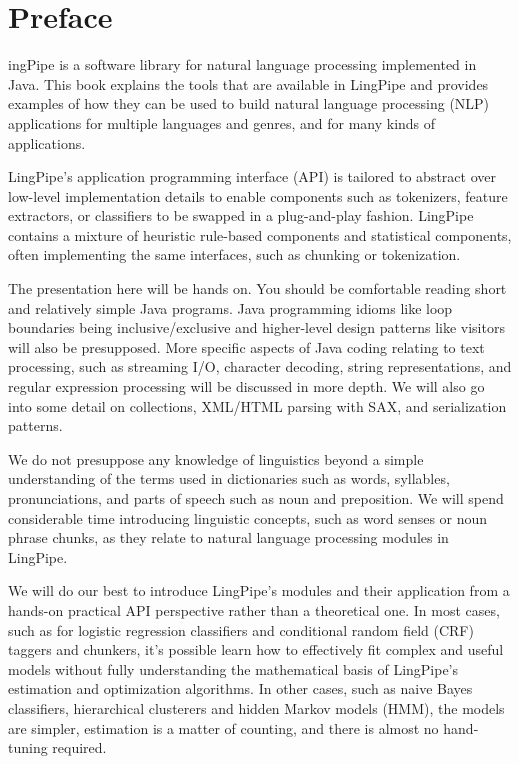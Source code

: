 \chapter*{Preface}
\pagestyle{fancy}%

ingPipe is a software library for natural language processing
implemented in Java.  This book explains the tools that are available
in LingPipe and provides examples of how they can be used to build
natural language processing (NLP) applications for multiple languages
and genres, and for many kinds of applications.

LingPipe's application programming interface (API) is tailored to
abstract over low-level implementation details to enable components
such as tokenizers, feature extractors, or classifiers to be swapped
in a plug-and-play fashion.  LingPipe contains a mixture of heuristic
rule-based components and statistical components, often implementing
the same interfaces, such as chunking or tokenization.

The presentation here will be hands on.  You should be comfortable
reading short and relatively simple Java programs.  Java programming idioms
like loop boundaries being inclusive/exclusive and higher-level design
patterns like visitors will also be presupposed.  More specific
aspects of Java coding relating to text processing, such as streaming
I/O, character decoding, string representations, and regular
expression processing will be discussed in more depth.  We will also
go into some detail on collections, XML/HTML parsing with SAX, and
serialization patterns.

We do not presuppose any knowledge of linguistics beyond a simple
understanding of the terms used in dictionaries such as words,
syllables, pronunciations, and parts of speech such as noun and
preposition.  We will spend considerable time introducing linguistic
concepts, such as word senses or noun phrase chunks, as they relate to
natural language processing modules in LingPipe.

We will do our best to introduce LingPipe's modules and their
application from a hands-on practical API perspective rather than a
theoretical one.  In most cases, such as for logistic regression
classifiers and conditional random field (CRF) taggers and chunkers,
it's possible learn how to effectively fit complex and useful models
without fully understanding the mathematical basis of LingPipe's
estimation and optimization algorithms.  In other cases, such as naive
Bayes classifiers, hierarchical clusterers and hidden Markov models
(HMM), the models are simpler, estimation is a matter of counting,
and there is almost no hand-tuning required.

